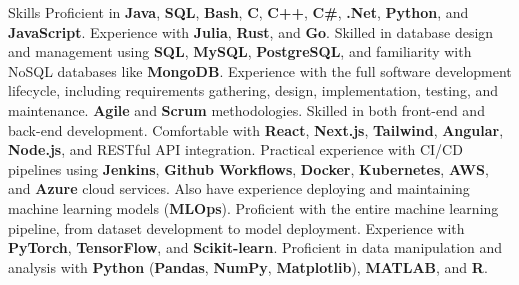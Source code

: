 \begin{rubric}{Skills}
    Proficient in \textbf{Java}, \textbf{SQL}, \textbf{Bash}, \textbf{C}, \textbf{C++}, \textbf{C\#}, \textbf{.Net}, \textbf{Python}, and \textbf{JavaScript}. Experience with \textbf{Julia}, \textbf{Rust}, and \textbf{Go}.
    Skilled in database design and management using \textbf{SQL}, \textbf{MySQL}, \textbf{PostgreSQL}, and familiarity with NoSQL databases like \textbf{MongoDB}.
    Experience with the full software development lifecycle, including requirements gathering, design, implementation, testing, and maintenance. \textbf{Agile} and \textbf{Scrum} methodologies.
    Skilled in both front-end and back-end development. Comfortable with \textbf{React}, \textbf{Next.js}, \textbf{Tailwind}, \textbf{Angular}, \textbf{Node.js}, and RESTful API integration.
    Practical experience with CI/CD pipelines using \textbf{Jenkins}, \textbf{Github Workflows}, \textbf{Docker}, \textbf{Kubernetes}, \textbf{AWS}, and \textbf{Azure} cloud services. Also have experience deploying and maintaining machine learning models (\textbf{MLOps}).
    Proficient with the entire machine learning pipeline, from dataset development to model deployment. Experience with \textbf{PyTorch}, \textbf{TensorFlow}, and \textbf{Scikit-learn}.
    Proficient in data manipulation and analysis with \textbf{Python} (\textbf{Pandas}, \textbf{NumPy}, \textbf{Matplotlib}), \textbf{MATLAB}, and \textbf{R}.
\end{rubric}
